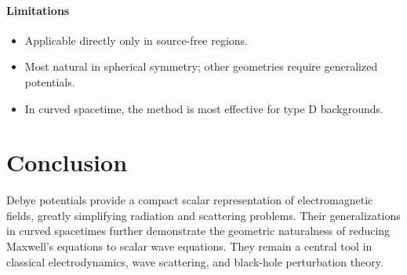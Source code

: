 \documentclass[11pt]{article}
\begin{document}
\paragraph{Limitations}
\begin{itemize}
\item Applicable directly only in source-free regions.
\item Most natural in spherical symmetry; other geometries require generalized potentials.
\item In curved spacetime, the method is most effective for type D backgrounds.
\end{itemize}

\section{Conclusion}

Debye potentials provide a compact scalar representation of
electromagnetic fields, greatly simplifying radiation and scattering
problems. Their generalizations in curved spacetimes further demonstrate
the geometric naturalness of reducing Maxwell's equations to scalar wave
equations. They remain a central tool in classical electrodynamics, wave
scattering, and black-hole perturbation theory.
\end{document}

